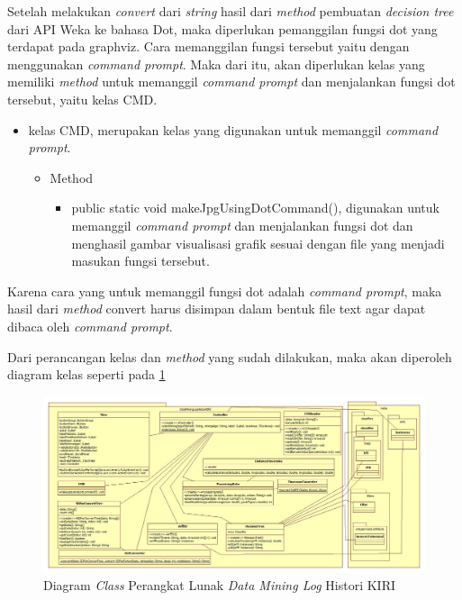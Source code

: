Setelah melakukan \textsl{convert} dari \textsl{string} hasil dari \textsl{method} pembuatan \textsl{decision tree} dari API Weka ke bahasa Dot, maka diperlukan pemanggilan fungsi dot yang terdapat pada graphviz. Cara memanggilan fungsi tersebut yaitu dengan menggunakan \textsl{command prompt}. Maka dari itu, akan diperlukan kelas yang memiliki \textsl{method} untuk memanggil \textsl{command prompt} dan menjalankan fungsi dot tersebut, yaitu kelas CMD.


\begin{itemize}
	\item kelas CMD, merupakan kelas yang digunakan untuk memanggil \textsl{command prompt}.
	\begin{itemize}
		\item Method
		\begin{itemize}
			\item public static void makeJpgUsingDotCommand(), digunakan untuk memanggil \textsl{command prompt} dan menjalankan fungsi dot dan menghasil gambar visualisasi grafik sesuai dengan file yang menjadi masukan fungsi tersebut.
		\end{itemize}
	\end{itemize}
\end{itemize}

Karena cara yang untuk memanggil fungsi dot adalah \textsl{command prompt}, maka hasil dari \textsl{method} convert harus disimpan dalam bentuk file text agar dapat dibaca oleh \textsl{command prompt}.

Dari perancangan kelas dan \textsl{method} yang sudah dilakukan, maka akan diperoleh diagram kelas seperti pada \ref{fig:classDiagram2}

\begin{figure}[H]
\includegraphics[scale=0.5, angle =90]{Gambar/classdiagram2.jpg}
\caption[Diagram \textsl{Class} Perangkat Lunak \textsl{Data Mining Log} Histori KIRI]{Diagram \textsl{Class} Perangkat Lunak \textsl{Data Mining Log} Histori KIRI} 
\label{fig:classDiagram2}
\end{figure}

